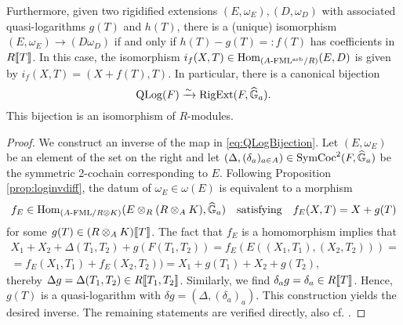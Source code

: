\documentclass[../main.tex]{subfiles}
\begin{document}
\begin{thm}
Furthermore, given two rigidified extensions
$(E, \omega_E), (D, \omega_{D})$ with associated quasi-logarithms
$g(T)$ and $h(T)$, there is a (unique) isomorphism $(E, \omega_E) \to (D \omega_{D})$
if and only if $h(T)-g(T) =: f(T)$ has coefficients in $R\llbracket T \rrbracket$. 
In this case, the isomorphism $i_f(X,T) \in \operatorname{Hom}_{{({A}\text-\allowbreak\mathrm{FML^{arb}}/{R})}}(E, D)$ is
given by $i_f(X,T) = (X+f(T), T)$. In particular, there is a canonical bijection
\begin{equation*}
  \operatorname {QLog}(F) \xrightarrow{\sim} \operatorname {RigExt}(F, \widehat{\mathbb{G}}_a).
\end{equation*}
This bijection is an isomorphism of $R$-modules.
\begin{proof}[Proof]
  We construct an inverse of the map in \eqref{eq:QLogBijection}. Let $(E,
  \omega_E)$ be an element of the set on the right
  and let $(\Delta, (\delta_a)_{a \in A}) \in
  \operatorname{SymCoc}^2(F, \widehat{\mathbb{G}}_a)$ be the symmetric 2-cochain corresponding to $E$.
  Following Proposition \ref{prop:loginvdiff}, the datum of 
  $\omega_E \in \omega(E)$ is equivalent to a morphism 
  $$f_E \in \operatorname{Hom}_{{({A}\text-\allowbreak\mathrm{FML}/{R \otimes K})}}(E \otimes_R (R \otimes_A K), \widehat{\mathbb{G}}_a)
  \quad \text{satisfying} \quad f_E(X,T) = X + g(T)$$
  for some $g(T) \in (R \otimes_A K)\llbracket T \rrbracket$. The fact that 
  $f_E$ is a homomorphism implies that 
  \begin{multline*}
    X_1 + X_2 + \Delta(T_1, T_2) + g(F(T_1,T_2)) = f_E(E((X_1, T_1), (X_2, T_2))) = \\
    = f_E(X_1, T_1) + f_E(X_2, T_2)) = X_1 + g(T_1) + X_2 + g(T_2),
  \end{multline*}
  thereby $\Delta g = \Delta(T_1, T_2) \in R\llbracket T_1, T_2\rrbracket$. Similarly, 
  we find $\delta_a g = \delta_a \in R\llbracket T \rrbracket$. Hence, $g(T)$ is a
  quasi-logarithm with $\delta g = (\Delta, (\delta_a)_a)$. 
  This construction yields the desired inverse.
  The remaining statements are verified directly, also cf. \cite[Section
  8]{hopkins1994equivariant}.
\end{proof}
\end{thm}
\end{document}
